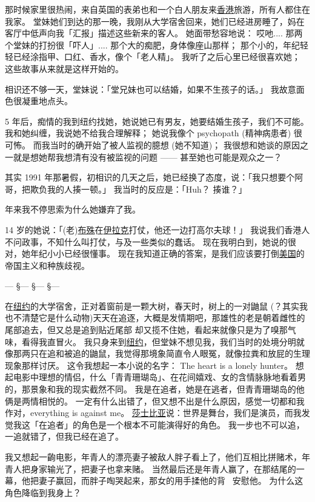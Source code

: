 \documentclass[12pt]{report}
\newcommand*\vignette{\begin{center}\color{blue}  --- \quad \S \quad --- \quad \S \quad --- \quad \S \quad --- \end{center}}
\begin{document}
那时候家里很热闹，来自英国的表弟也和一个白人朋友来\underline{香港}旅游，所有人都住在我家。  堂妹她们到达的那一晚，我刚从大学宿舍回来，她们已经进房睡了，妈在客厅中低声向我「汇报」描述这些新来的客人。    她面带愁容地说： 哎吔.... 那两个堂妹的打扮很「吓人」.... 那个大的痴肥，身体像座山那样； 那个小的，年纪轻轻已经涂指甲、口红、香水，像个「老人精」。   我听了之后心里已经很喜欢她； 这些故事从来就是这样开始的。

相识还不够一天，堂妹说：「堂兄妹也可以结婚，如果不生孩子的话。」 我故意面色很凝重地点头。

5 年后，痴情的我到纽约找她，她说她已有男友，她要结婚生孩子，我们不可能。 我和她纠缠，我说她不给我合理解释； 她说我像个 psychopath (精神病患者) 很可怖。 而我当时的确开始了被人监视的臆想 (她不知道)； 我很想和她谈的原因之一就是想她帮我想清有没有被监视的问题 —— 甚至她也可能是观众之一？

其实 1991 年那暑假，初相识的几天之后，她已经换了态度，说：「我只想要个阿哥，把欺负我的人揍一顿。」 我当时的反应是：「Huh？ 揍谁？」

\resultb 年来我不停思索为什么她嫌弃了我。

14 岁的她说：「(老)\underline{布殊}在\underline{伊拉克}打仗，他还一边打高尔夫球！」 我说我们香港人不问政事，不知什么叫打仗，与及一些类似的蠢话。  现在我明白到，她说的很对，她年纪小小已经很懂事。  现在我知道正确的答案，是我们应该要打倒\underline{美国}的帝国主义和种族歧视。

\vignette

在\underline{纽约}的大学宿舍，正对着窗前是一颗大树，春天时，树上的一对鼬鼠 (？其实我也不清楚它是什么动物)天天在追逐，大概是发情期吧，那雄性的老是朝着雌性的尾部追去，但又总是追到贴近尾部 却又揽不住她，看起来就像只是为了嗅那气味，看得我直冒火。  我只身来到\underline{纽约}，但堂妹不想见我，我们当时的处境分明就像那两只在追和被追的鼬鼠，我觉得那境象简直令人眼冤，就像拉粪和放屁的生理现象那样讨厌。  这令我想起一本小说的名字： The heart is a lonely hunter。  想起电影中理想的情侣，什么「青青珊瑚岛」、在花间嬉戏、女的含情脉脉地看着男的，那景象和我的现实截然不同。  我是在追者，她是在逃者，但青青珊瑚岛的他俩是两情相悦的。  一定有什么出错了，但又想不出是什么原因，感觉一切都和我作对，everything is against me。  \underline{莎士比亚}说：世界是舞台，我们是演员，而我发觉我这「在追者」的角色是一个根本不可能演得好的角色。  我一步也不可以追，一追就错了，但我已经在追了。

我又想起一齣电影，年青人的漂亮妻子被敌人胖子看上了，他们互相比拼赌术，年青人把身家输光了，把妻子也拿来赌。  当然最后还是年青人赢了，在那结尾的一幕，他把妻子赢回，而胖子啕哭起来，那女的用手揉他的背 ~安慰他。  为什么这角色降临到我身上？
\end{document}
